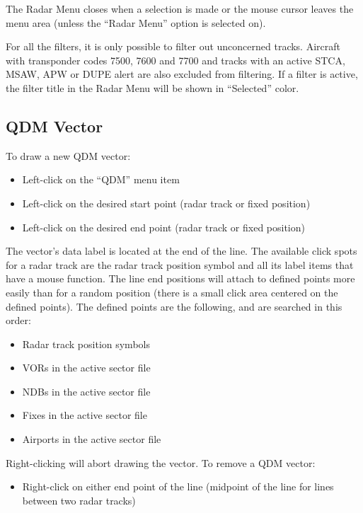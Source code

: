 \documentclass[11pt,a4paper]{memoir}
\begin{document}
The Radar Menu closes when a selection is made or the mouse cursor leaves the menu area (unless the “Radar Menu” option is selected on).

For all the filters, it is only possible to filter out unconcerned tracks. Aircraft with transponder codes 7500, 7600 and 7700 and tracks with an active STCA, MSAW, APW or DUPE alert are also excluded from filtering. If a filter is active, the filter title in the Radar Menu will be shown in “Selected” color.

\subsection{QDM Vector}
\label{qdm}

To draw a new QDM vector:
\begin{itemize}
    \item Left-click on the “QDM” menu item
    \item Left-click on the desired start point (radar track or fixed position)
    \item Left-click on the desired end point (radar track or fixed position)
\end{itemize}

The vector’s data label is located at the end of the line. The available click spots for a radar track are the radar track position symbol and all its label items that have a mouse function.
The line end positions will attach to defined points more easily than for a random position (there is a small click area centered on the defined points). The defined points are the following, and are searched in this order:

\begin{itemize}
    \item Radar track position symbols
    \item VORs in the active sector file
    \item NDBs in the active sector file
    \item Fixes in the active sector file
    \item Airports in the active sector file
\end{itemize}

Right-clicking will abort drawing the vector.
To remove a QDM vector:

\begin{itemize}
    \item Right-click on either end point of the line (midpoint of the line for lines between two radar tracks)
\end{itemize}
\end{document}

